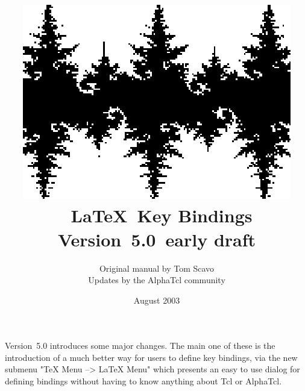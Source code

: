 \documentclass[titlepage]{article}
\begin{document}
\title{
	\includegraphics{logo.eps}  \\[6ex]
	\Alpha\ \LaTeX\ Key Bindings \\
        {\large Version~5.0~early draft}
}
\author{
Original manual by Tom Scavo \\
Updates by the AlphaTcl community
}
\date{August 2003}
\maketitle
\thispagestyle{empty}

Version~5.0 introduces some major changes.  The main one of these is
the introduction of a much better way for users to define key
bindings, via the new submenu "TeX Menu --> LaTeX Menu" which
presents an easy to use dialog for defining bindings without having
to know anything about Tcl or AlphaTcl.
\end{document}

